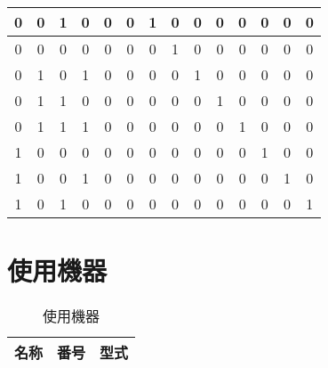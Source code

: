 \documentclass[dvipdfmx]{jsarticle}
\begin{document}
\begin{enumerate}
\begin{itemize}
\begin{table}[H]
\begin{tabular}{|c|c|c|c|c|c|c|c|c|c|c|c|c|c|}
										0 &     0 &     1 &     0 & 0 & 0 & 1 & 0 & 0 & 0 & 0 & 0 & 0 & 0 \\ \hline
										0 &     0 &     0 &     0 & 0 & 0 & 0 & 1 & 0 & 0 & 0 & 0 & 0 & 0 \\ \hline
										0 &     1 &     0 &     1 & 0 & 0 & 0 & 0 & 1 & 0 & 0 & 0 & 0 & 0 \\ \hline
										0 &     1 &     1 &     0 & 0 & 0 & 0 & 0 & 0 & 1 & 0 & 0 & 0 & 0 \\ \hline
										0 &     1 &     1 &     1 & 0 & 0 & 0 & 0 & 0 & 0 & 1 & 0 & 0 & 0 \\ \hline
										1 &     0 &     0 &     0 & 0 & 0 & 0 & 0 & 0 & 0 & 0 & 1 & 0 & 0 \\ \hline
										1 &     0 &     0 &     1 & 0 & 0 & 0 & 0 & 0 & 0 & 0 & 0 & 1 & 0 \\ \hline
										1 &     0 &     1 &     0 & 0 & 0 & 0 & 0 & 0 & 0 & 0 & 0 & 0 & 1 \\ \hline
								\end{tabular}
							\end{table}
					\end{itemize}
				\end{enumerate}
	\section{使用機器}
		\begin{table}[H]
			\center
			\caption{使用機器}
			\begin{tabular}{|c|c|c|}
				\hline
				名称 & 番号 & 型式 \\ \hline
			\end{tabular}
		\end{table}
\end{document}
